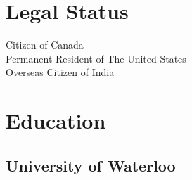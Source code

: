 \documentclass[letterpaper]{deedy-resume} %
\begin{document}
\begin{minipage}[t]{0.33\textwidth} %


\section{Legal Status} 

Citizen of Canada \\
Permanent Resident of The United States \\
Overseas Citizen of India

\sectionspace %


\section{Education} 

\subsection{University of Waterloo}


\sectionspace %






% 
% 



\end{minipage}
\end{document}

